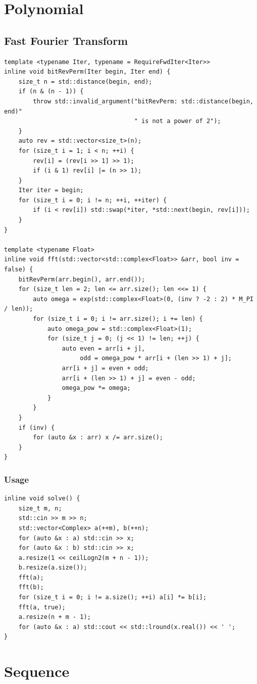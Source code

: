 \documentclass[UTF8]{article}
\begin{document}
\section{Polynomial}
\subsection{Fast Fourier Transform}
\begin{verbatim}
template <typename Iter, typename = RequireFwdIter<Iter>>
inline void bitRevPerm(Iter begin, Iter end) {
	size_t n = std::distance(begin, end);
	if (n & (n - 1)) {
		throw std::invalid_argument("bitRevPerm: std::distance(begin, end)"
									" is not a power of 2");
	}
	auto rev = std::vector<size_t>(n);
	for (size_t i = 1; i < n; ++i) {
		rev[i] = (rev[i >> 1] >> 1);
		if (i & 1) rev[i] |= (n >> 1);
	}
	Iter iter = begin;
	for (size_t i = 0; i != n; ++i, ++iter) {
		if (i < rev[i]) std::swap(*iter, *std::next(begin, rev[i]));
	}
}

template <typename Float>
inline void fft(std::vector<std::complex<Float>> &arr, bool inv = false) {
	bitRevPerm(arr.begin(), arr.end());
	for (size_t len = 2; len <= arr.size(); len <<= 1) {
		auto omega = exp(std::complex<Float>(0, (inv ? -2 : 2) * M_PI / len));
		for (size_t i = 0; i != arr.size(); i += len) {
			auto omega_pow = std::complex<Float>(1);
			for (size_t j = 0; (j << 1) != len; ++j) {
				auto even = arr[i + j],
					 odd = omega_pow * arr[i + (len >> 1) + j];
				arr[i + j] = even + odd;
				arr[i + (len >> 1) + j] = even - odd;
				omega_pow *= omega;
			}
		}
	}
	if (inv) {
		for (auto &x : arr) x /= arr.size();
	}
}
\end{verbatim}
\subsubsection{Usage}
\begin{verbatim}
inline void solve() {
	size_t m, n;
	std::cin >> m >> n;
	std::vector<Complex> a(++m), b(++n);
	for (auto &x : a) std::cin >> x;
	for (auto &x : b) std::cin >> x;
	a.resize(1 << ceilLogn2(m + n - 1));
	b.resize(a.size());
	fft(a);
	fft(b);
	for (size_t i = 0; i != a.size(); ++i) a[i] *= b[i];
	fft(a, true);
	a.resize(n + m - 1);
	for (auto &x : a) std::cout << std::lround(x.real()) << ' ';
}
\end{verbatim}

\section{Sequence}
\end{document}

